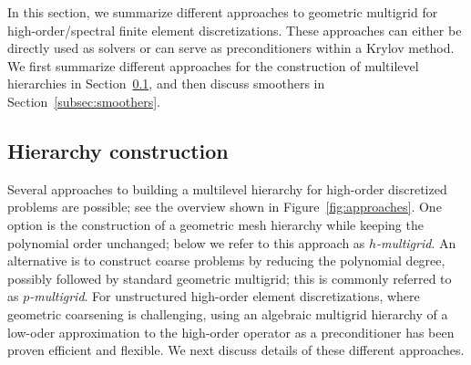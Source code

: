 \documentclass[smallcondensed,final]{svjour3}     %
\begin{document}
In this section, we summarize different approaches to geometric
multigrid for high-order/spectral finite element
discretizations. These approaches can either be directly used as
solvers or can serve as preconditioners within a Krylov method. We
first summarize different approaches for the construction of
multilevel hierarchies in Section~\ref{subsec:hierarchy}, and then
discuss smoothers in Section~\ref{subsec:smoothers}.

\subsection{Hierarchy construction}\label{subsec:hierarchy}
Several approaches to building a multilevel hierarchy for high-order
discretized problems are possible; see the overview shown in
Figure~\ref{fig:approaches}. One option is the construction of a
geometric mesh hierarchy while keeping the polynomial order unchanged;
below we refer to this approach as \emph{$h$-multigrid}. An
alternative is to construct coarse problems by reducing the polynomial
degree, possibly followed by standard geometric multigrid; this is
commonly referred to as \emph{$p$-multigrid}. For unstructured
high-order element discretizations, where geometric coarsening is
challenging, using an algebraic multigrid hierarchy of a low-oder
approximation to the high-order operator as a preconditioner has been
proven efficient and flexible. We next discuss details of these
different approaches.
\end{document}
